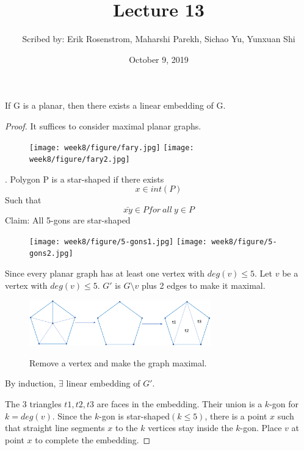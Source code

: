 \documentclass{article}
\begin{document}
  \title{Lecture 13}
  \author{Scribed by: Erik Rosenstrom, Maharshi Parekh, Sichao Yu, Yunxuan Shi }
  \date{October 9, 2019}
  \maketitle


  \begin{theorem}
     If G is a planar, then there exists a linear embedding of G.
  \end{theorem}
  \begin{proof}
    It suffices to consider maximal planar graphs.
  

  \begin{figure}[htp]
    \centering %
    \texttt{[image: week8/figure/fary.jpg]}
    \texttt{[image: week8/figure/fary2.jpg]}
  \end{figure}
  
  
  \begin{defination}
    . Polygon P is a star-shaped if there exists \[x\in  int(P)\] Such that \[ \bar{xy}\in P for \ all \ y \in P\]
    Claim: All 5-gons are star-shaped
   \end{defination}   
    
  \begin{figure}[htp]
    \centering %
    \texttt{[image: week8/figure/5-gons1.jpg]}
    \texttt{[image: week8/figure/5-gons2.jpg]}
  \end{figure}
    
    Since every planar graph has at least one vertex with \(deg(v)\leq 5 \).
    Let \(v\) be a vertex with \(deg(v)\leq 5 \). \(G'\) is \(G\setminus v\) plus 2 edges to make it maximal. 
    \begin{figure}[!h]
      \centering
      {\includegraphics[width=0.7\textwidth]{figure/pentagon.png}}
      \caption{Remove a vertex and make the graph maximal.}
      \label{pentagon}
    \end{figure}
    By induction, \(\exists\) linear embedding of \(G'\).
    
    
    The 3 triangles \(t1, t2, t3\) are faces in the embedding. Their union is a \(k\)-gon for \(k = deg(v)\). Since the \(k\)-gon is star-shaped\((k\leq 5)\), there is a point \(x\) such that straight line segments \(x\) to the \(k\) vertices stay inside the \(k\)-gon. Place \(v\) at point \(x\) to complete the embedding.
    \end{proof}
\end{document}
